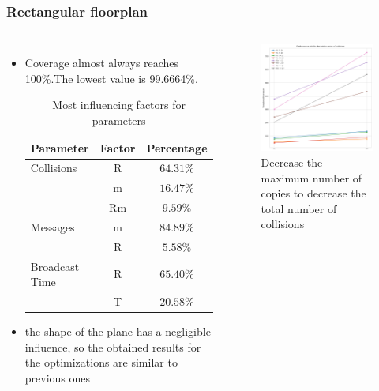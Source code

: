 \documentclass[aspectratio=169]{beamer}
\begin{document}
\begin{frame}
	\frametitle{Rectangular floorplan}
		\begin{columns}
		 \begin{itemize}
		     \item
	Coverage almost always reaches 100\%.The lowest value is 99.6664\%. \\[5pt]

		\begin{table}
			\begin{tabular}{l | c | c}
				Parameter & Factor & Percentage \\
				\hline \hline
				Collisions & R & \(64.31 \%\) \\
				& m & \(16.47\%\) \\& Rm& \(9.59 \%\) \\
				\hline
				Messages & m & \(84.89\%\) \\& R & \(5.58\%\) \\
				\hline
				Broadcast Time & R & \(65.40\%\) \\
				& T & \(20.58\%\) \\
				\hline
			\end{tabular}
			\caption{Most influencing factors for parameters}
		\end{table}
		\item the shape of the plane has a negligible influence, so the obtained results for the optimizations are similar to previous ones
		\end{itemize}
				\begin{figure}
		    \includegraphics[height=0.65\textheight]{img/rect/collisions_m_perfplot.png}
		    \caption{Decrease the maximum number of copies to decrease the total
number of collisions}
		\end{figure}

	\end{columns}
\end{frame}
\end{document}
